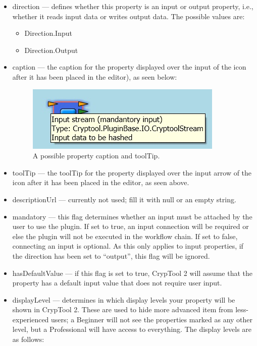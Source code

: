 \begin{itemize}
	\item direction --- defines whether this property is an input or output property, i.e., whether it reads input data or writes output data. The possible values are:
	\begin{itemize}
		\item Direction.Input
		\item Direction.Output
	\end{itemize}
	\item caption --- the caption for the property displayed over the input of the icon after it has been placed in the editor), as seen below:
	
\begin{figure}[h]
	\centering
		\includegraphics[width=.55\textwidth]{figures/property_caption.jpg}
	\caption{A possible property caption and toolTip.}
	\label{fig:property_caption}
\end{figure}

	\item toolTip --- the toolTip for the property displayed over the input arrow of the icon after it has been placed in the editor, as seen above.
	\item descriptionUrl --- currently not used; fill it with null or an empty string.
	\item mandatory --- this flag determines whether an input must be attached by the user to use the plugin. If set to true, an input connection will be required or else the plugin will not be executed in the workflow chain. If set to false, connecting an input is optional. As this only applies to input properties, if the direction has been set to ``output'', this flag will be ignored.
	\item hasDefaultValue --- if this flag is set to true, CrypTool 2 will assume that the property has a default input value that does not require user input.
	\item displayLevel --- determines in which display levels your property will be shown in CrypTool 2. These are used to hide more advanced item from less-experienced users; a Beginner will not see the properties marked as any other level, but a Professional will have access to everything. The display levels are as follows:
	

\end{itemize}
